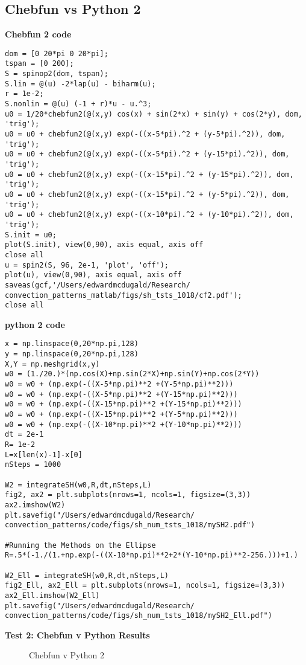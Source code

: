 \documentclass[12pt]{article}
\begin{document}
\subsection{Chebfun vs Python 2}
\textbf{Chebfun 2 code}
\begin{verbatim}
dom = [0 20*pi 0 20*pi];
tspan = [0 200];
S = spinop2(dom, tspan);
S.lin = @(u) -2*lap(u) - biharm(u);
r = 1e-2;
S.nonlin = @(u) (-1 + r)*u - u.^3;
u0 = 1/20*chebfun2(@(x,y) cos(x) + sin(2*x) + sin(y) + cos(2*y), dom, 'trig');
u0 = u0 + chebfun2(@(x,y) exp(-((x-5*pi).^2 + (y-5*pi).^2)), dom, 'trig');
u0 = u0 + chebfun2(@(x,y) exp(-((x-5*pi).^2 + (y-15*pi).^2)), dom, 'trig');
u0 = u0 + chebfun2(@(x,y) exp(-((x-15*pi).^2 + (y-15*pi).^2)), dom, 'trig');
u0 = u0 + chebfun2(@(x,y) exp(-((x-15*pi).^2 + (y-5*pi).^2)), dom, 'trig');
u0 = u0 + chebfun2(@(x,y) exp(-((x-10*pi).^2 + (y-10*pi).^2)), dom, 'trig');
S.init = u0;
plot(S.init), view(0,90), axis equal, axis off
close all
u = spin2(S, 96, 2e-1, 'plot', 'off');
plot(u), view(0,90), axis equal, axis off
saveas(gcf,'/Users/edwardmcdugald/Research/
convection_patterns_matlab/figs/sh_tsts_1018/cf2.pdf');
close all
\end{verbatim}

\textbf{python 2 code}
\begin{verbatim}
x = np.linspace(0,20*np.pi,128)
y = np.linspace(0,20*np.pi,128)
X,Y = np.meshgrid(x,y)
w0 = (1./20.)*(np.cos(X)+np.sin(2*X)+np.sin(Y)+np.cos(2*Y))
w0 = w0 + (np.exp(-((X-5*np.pi)**2 +(Y-5*np.pi)**2)))
w0 = w0 + (np.exp(-((X-5*np.pi)**2 +(Y-15*np.pi)**2)))
w0 = w0 + (np.exp(-((X-15*np.pi)**2 +(Y-15*np.pi)**2)))
w0 = w0 + (np.exp(-((X-15*np.pi)**2 +(Y-5*np.pi)**2)))
w0 = w0 + (np.exp(-((X-10*np.pi)**2 +(Y-10*np.pi)**2)))
dt = 2e-1
R= 1e-2
L=x[len(x)-1]-x[0]
nSteps = 1000

W2 = integrateSH(w0,R,dt,nSteps,L)
fig2, ax2 = plt.subplots(nrows=1, ncols=1, figsize=(3,3))
ax2.imshow(W2)
plt.savefig("/Users/edwardmcdugald/Research/
convection_patterns/code/figs/sh_num_tsts_1018/mySH2.pdf")

#Running the Methods on the Ellipse
R=.5*(-1./(1.+np.exp(-((X-10*np.pi)**2+2*(Y-10*np.pi)**2-256.)))+1.)

W2_Ell = integrateSH(w0,R,dt,nSteps,L)
fig2_Ell, ax2_Ell = plt.subplots(nrows=1, ncols=1, figsize=(3,3))
ax2_Ell.imshow(W2_Ell)
plt.savefig("/Users/edwardmcdugald/Research/
convection_patterns/code/figs/sh_num_tsts_1018/mySH2_Ell.pdf")
\end{verbatim}
\FloatBarrier

\textbf{Test 2: Chebfun v Python Results}
\begin{figure}[!tbp]
  \centering
  \hfill
  \caption{Chebfun v Python 2}
\end{figure}
\FloatBarrier
\end{document}
